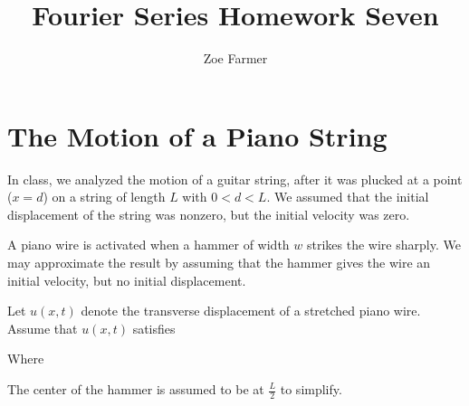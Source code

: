 \documentclass[10pt]{article}
\title{Fourier Series Homework Seven}
\author{Zoe Farmer}
\begin{document}
\maketitle

\section{The Motion of a Piano String}
In class, we analyzed the motion of a guitar string, after it was plucked at a point ($x=d$) on a string of length $L$
with $0 < d < L$. We assumed that the initial displacement of the string was nonzero, but the initial velocity was zero.

A piano wire is activated when a hammer of width $w$ strikes the wire sharply. We may approximate the result by assuming
that the hammer gives the wire an initial velocity, but no initial displacement.

Let $u(x, t)$ denote the transverse displacement of a stretched piano wire. Assume that $u(x, t)$ satisfies


Where


The center of the hammer is assumed to be at $\frac{L}{2}$ to simplify.
\end{document}
